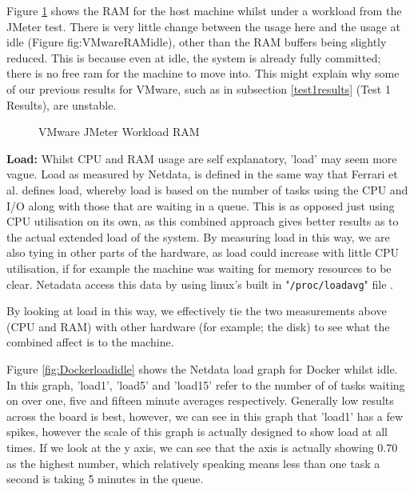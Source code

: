 Figure \ref{fig:VMwareRAMwork} shows the RAM for the host machine whilst under a workload from the JMeter test. There is very little change between the usage here and the usage at idle (Figure {fig:VMwareRAMidle}), other than the RAM buffers being slightly reduced. This is because even at idle, the system is already fully committed; there is no free ram for the machine to move into. This might explain why some of our previous results for VMware, such as in subsection \ref{test1results} (Test 1 Results), are unstable.

\begin{figure}[H]
\caption{VMware JMeter Workload RAM}
\label{fig:VMwareRAMwork}
\centering
\end{figure}

\textbf{Load:}
Whilst CPU and RAM usage are self explanatory, 'load' may seem more vague. Load as measured by Netdata, is defined in the same way that Ferrari et al. defines load, whereby load is based on the number of tasks using the CPU and I/O along with those that are waiting in a queue\citep{loadferrari}. This is as opposed just using CPU utilisation on its own, as this combined approach gives better results as to the actual extended load of the system. By measuring load in this way, we are also tying in other parts of the hardware, as load could increase with little CPU utilisation, if for example the machine was waiting for memory resources to be clear. Netadata access this data by using linux's built in "\texttt{/proc/loadavg}" file \citep{systemload}.

By looking at load in this way, we effectively tie the two measurements above (CPU and RAM) with other hardware (for example; the disk) to see what the combined affect is to the machine.

Figure \ref{fig:Dockerloadidle} shows the Netdata load graph for Docker whilst idle. In this graph, 'load1', 'load5' and 'load15' refer to the number of of tasks waiting on over one, five and fifteen minute averages respectively. Generally low results across the board is best, however, we can see in this graph that 'load1' has a few spikes, however the scale of this graph is actually designed to show load at all times. If we look at the y axis, we can see that the axis is actually showing 0.70 as the highest number, which relatively speaking means less than one task a second is taking 5 minutes in the queue.

